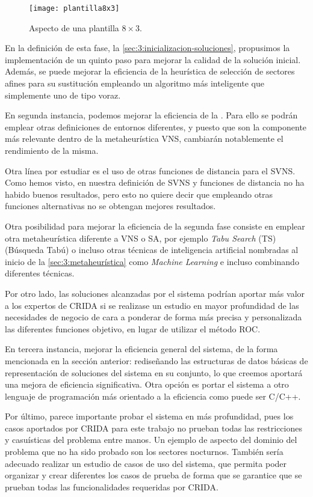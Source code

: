 \begin{figure}
	\centering
	\texttt{[image: plantilla8x3]}
	\caption{Aspecto de una plantilla $8\times3$.}
	\label{fig:6:plantilla8x3}
\end{figure}

En la definición de esta fase, la \autoref{sec:3:inicializacion-soluciones}, propusimos la implementación de un quinto paso para mejorar la calidad de la solución inicial. 
Además, se puede mejorar la eficiencia de la heurística de selección de sectores afines para su sustitución empleando un algoritmo más inteligente que simplemente uno de tipo voraz.

En segunda instancia, podemos mejorar la eficiencia de la \fasedos{}. Para ello se podrán emplear otras definiciones de entornos diferentes, y puesto que son la componente más relevante dentro de la metaheurística VNS, cambiarán notablemente el rendimiento de la misma. 

Otra línea por estudiar es el uso de otras funciones de distancia para el SVNS. Como hemos visto, en nuestra definición de SVNS y funciones de distancia no ha habido buenos resultados, pero esto no quiere decir que empleando otras funciones alternativas no se obtengan mejores resultados. 

Otra posibilidad para mejorar la eficiencia de la segunda fase consiste en emplear otra metaheurística diferente a VNS o SA, por ejemplo \textit{Tabu Search} (TS) (Búsqueda Tabú) o incluso otras técnicas de inteligencia artificial nombradas al inicio de la \autoref{sec:3:metaheurística} como \textit{Machine Learning} e incluso combinando diferentes técnicas.

Por otro lado, las soluciones alcanzadas por el sistema podrían aportar más valor a los expertos de CRIDA si se realizase un estudio en mayor profundidad de las necesidades de negocio de cara a ponderar de forma más precisa y personalizada las diferentes funciones objetivo, en lugar de utilizar el método ROC.

En tercera instancia, mejorar la eficiencia general del sistema, de la forma mencionada en la sección anterior: rediseñando las estructuras de datos básicas de representación de soluciones del sistema en su conjunto, lo que creemos aportará una mejora de eficiencia significativa. Otra opción es portar el sistema a otro lenguaje de programación más orientado a la eficiencia como puede ser C/C++. 

Por último, parece importante probar el sistema en más profundidad, pues los casos aportados por CRIDA para este trabajo no prueban todas las restricciones y casuísticas del problema entre manos. Un ejemplo de aspecto del dominio del problema que no ha sido probado son los sectores nocturnos. También sería adecuado realizar un estudio de casos de uso del sistema, que permita poder organizar y crear diferentes los casos de prueba de forma que se garantice que se prueban todas las funcionalidades requeridas por CRIDA.
